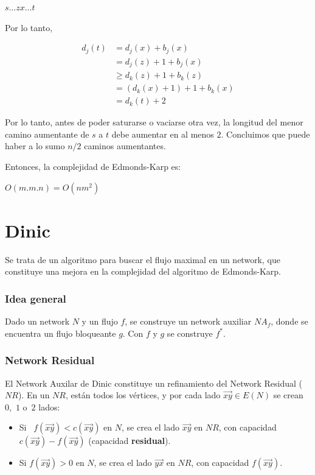 \documentclass[10pt,a4paper]{article}
\begin{document}
\begin{center}
$s\dots zx\dots t$
\end{center}

Por lo tanto,

\begin{center}
\begin{align*} d_j(t) &= d_j(x) + b_j(x)\\ &= d_j(z)+1+b_j(x)\\ &\geq d_k(z) + 1 + b_k(z)\\ &= (d_k(x)+1) + 1 + b_k(x)\\ &= d_k(t) + 2 \end{align*}
\end{center}

Por lo tanto, antes de poder saturarse o vaciarse otra vez, la longitud del menor camino aumentante de $s$ a $t$ debe aumentar en al menos $2$. Concluimos que puede haber a lo sumo $n/2$ caminos aumentantes.

Entonces, la complejidad de Edmonds-Karp es:

\begin{center}
$O(m.m.n)=O(nm^2)$
\end{center}

\section*{Dinic}

Se trata de un algoritmo para buscar el flujo maximal en un network, que constituye una mejora en la complejidad del algoritmo de Edmonds-Karp.

\subsubsection*{Idea general}

Dado un network $N$ y un flujo $f$, se construye un network auxiliar $NA_f$, donde se encuentra un flujo bloqueante $g$. Con $f$ y $g$ se construye $f^*$.

\subsubsection*{Network Residual}

El Network Auxilar de Dinic constituye un refinamiento del Network Residual ($NR$). En un $NR$, están todos los vértices, y por cada lado $\overrightarrow{xy} \in E(N)$ se crean $0$, $1$ o $2$ lados:

\begin{itemize}

	\item Si  $f(\overrightarrow{xy}) < c(\overrightarrow{xy}) $ en $N$, se crea el lado $\overrightarrow{xy}$ en $NR$, con capacidad $c(\overrightarrow{xy}) - f(\overrightarrow{xy})$ (capacidad \textbf{residual}).
	\item Si $f(\overrightarrow{xy}) > 0$ en $N$, se crea el lado $\overrightarrow{yx}$ en $NR$, con capacidad $f(\overrightarrow{xy})$.
\end{itemize}
\end{document}

